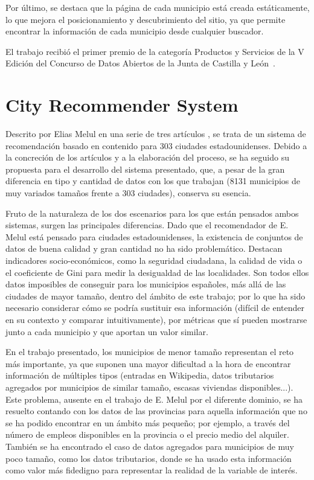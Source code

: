 Por último, se destaca que la página de cada municipio está creada estáticamente, lo que mejora el posicionamiento y descubrimiento del sitio, ya que permite encontrar la información de cada municipio desde cualquier buscador.

El trabajo recibió el primer premio de la categoría Productos y Servicios de la V Edición del Concurso de Datos Abiertos de la Junta de Castilla y León~\cite{cyl}.

\section{City Recommender System}

Descrito por Elias Melul en una serie de tres artículos \cite{US1, US2, US3}, se trata de un sistema de recomendación basado en contenido para 303 ciudades estadounidenses. Debido a la concreción de los artículos y a la elaboración del proceso, se ha seguido su propuesta para el desarrollo del sistema presentado, que, a pesar de la gran diferencia en tipo y cantidad de datos con los que trabajan (8131 municipios de muy variados tamaños frente a 303 ciudades), conserva su esencia.

Fruto de la naturaleza de los dos escenarios para los que están pensados ambos sistemas, surgen las principales diferencias. Dado que el recomendador de E. Melul está pensado para ciudades estadounidenses, la existencia de conjuntos de datos de buena calidad y gran cantidad no ha sido problemático. Destacan indicadores socio-económicos, como la seguridad ciudadana, la calidad de vida o el coeficiente de Gini para medir la desigualdad de las localidades. Son todos ellos datos imposibles de conseguir para los municipios españoles, más allá de las ciudades de mayor tamaño, dentro del ámbito de este trabajo; por lo que ha sido necesario considerar cómo se podría sustituir esa información (difícil de entender en su contexto y comparar intuitivamente), por métricas que sí pueden mostrarse junto a cada municipio y que aportan un valor similar.

En el trabajo presentado, los municipios de menor tamaño representan el reto más importante, ya que suponen una mayor dificultad a la hora de encontrar información de múltiples tipos (entradas en Wikipedia, datos tributarios agregados por municipios de similar tamaño, escasas viviendas disponibles...). Este problema, ausente en el trabajo de E. Melul por el diferente dominio, se ha resuelto contando con los datos de las provincias para aquella información que no se ha podido encontrar en un ámbito más pequeño; por ejemplo, a través del número de empleos disponibles en la provincia o el precio medio del alquiler. También se ha encontrado el caso de datos agregados para municipios de muy poco tamaño, como los datos tributarios, donde se ha usado esta información como valor más fidedigno para representar la realidad de la variable de interés.

